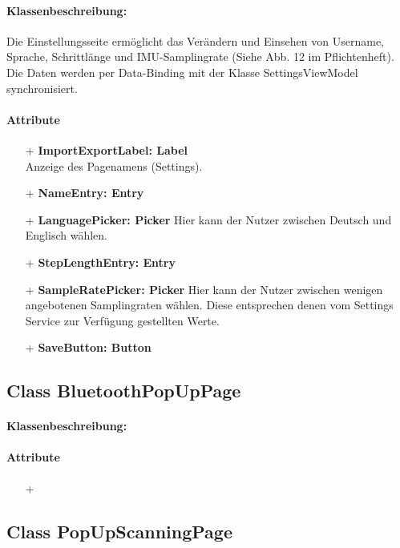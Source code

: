 \documentclass[a4paper,12pt]{article}
\begin{document}
		\paragraph{Klassenbeschreibung:}
		Die Einstellungsseite ermöglicht das Verändern und Einsehen von Username, Sprache, Schrittlänge und IMU-Samplingrate (Siehe Abb. 12 im Pflichtenheft). Die Daten werden per Data-Binding mit der Klasse SettingsViewModel synchronisiert.
		\paragraph{Attribute}
		\begin{itemize}
			\item[+] \textbf{ImportExportLabel: Label} \\ Anzeige des Pagenamens (Settings).
			\item [+]\textbf{NameEntry: Entry}
			\item [+]\textbf{LanguagePicker: Picker} Hier kann der Nutzer zwischen Deutsch und Englisch wählen.
			\item [+]\textbf{StepLengthEntry: Entry} 
			\item [+]\textbf{SampleRatePicker: Picker} Hier kann der Nutzer zwischen wenigen angebotenen Samplingraten wählen. Diese entsprechen denen vom Settings Service zur Verfügung gestellten Werte.
			\item [+]\textbf{SaveButton: Button}
		\end{itemize}
	\subsection{Class BluetoothPopUpPage}%
		\paragraph{Klassenbeschreibung:}
		\paragraph{Attribute}
		\begin{itemize}
			\item [+]
		\end{itemize}

	\subsection{Class PopUpScanningPage}
\end{document}
